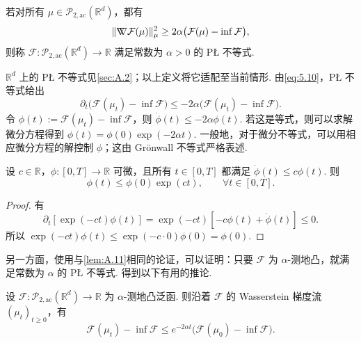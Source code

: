 \begin{definition}\label{def:5.15}
若对所有 $\mu\in\mathcal P_{2,\mathrm{ac}}(\mathbb R^d)$，都有
$$
\|\nabla\mkern-10mu\nabla\mathcal F(\mu)\|_\mu^2
\geq2\alpha\bigl(\mathcal F(\mu)-\inf\mathcal F\bigr),
$$
则称 $\mathcal F:\mathcal P_{2,\mathrm{ac}}(\mathbb R^d)\to\mathbb R$ 满足常数为 $\alpha>0$ 的 PŁ 不等式.
\end{definition}

$\mathbb R^d$ 上的 PŁ 不等式见\autoref{sec:A.2}；以上定义将它适配至当前情形. 由\eqref{eq:5.10}，PŁ 不等式给出
$$
\partial_t\bigl(\mathcal F(\mu_t)-\inf\mathcal F\bigr)
\leq-2\alpha\bigl(\mathcal F(\mu_t)-\inf\mathcal F\bigr).
$$
令 $\phi(t):=\mathcal F(\mu_t)-\inf\mathcal F$，则 $\dot\phi(t)\leq-2\alpha\phi(t)$. 若这是等式，则可以求解微分方程得到 $\phi(t)=\phi(0)\exp(-2\alpha t)$. 一般地，对于微分不等式，可以用相应微分方程的解控制 $\phi$；这由 Grönwall 不等式严格表述.

\begin{lemma}\label{lem:5.16}
设 $c\in\mathbb R$，$\phi:[0,T]\to\mathbb R$ 可微，且所有 $t\in[0,T]$ 都满足 $\dot\phi(t)\leq c\phi(t)$. 则
$$
\phi(t)\leq\phi(0)\exp(ct),\qquad\forall t\in[0,T].
$$
\end{lemma}
\begin{proof}
有
$$
\partial_t[\exp(-ct)\phi(t)]
=\exp(-ct)[-c\phi(t)+\dot\phi(t)]\leq0.
$$
所以 $\exp(-ct)\phi(t)\leq\exp(-c\cdot0)\phi(0)=\phi(0)$.
\end{proof}

另一方面，使用与\autoref{lem:A.11}相同的论证，可以证明：只要 $\mathcal F$ 为 $\alpha$-测地凸，就满足常数为 $\alpha$ 的 PŁ 不等式. 得到以下有用的推论.

\begin{corollary}\label{cor:5.17}
设 $\mathcal F:\mathcal P_{2,\mathrm{ac}}(\mathbb R^d)\to\mathbb R$ 为 $\alpha$-测地凸泛函. 则沿着 $\mathcal F$ 的 Wasserstein 梯度流 $(\mu_t)_{t\geq0}$，有
$$
\mathcal F(\mu_t)-\inf\mathcal F
\leq e^{-2\alpha t}\bigl(\mathcal F(\mu_0)-\inf\mathcal F\bigr).
$$
\end{corollary}
